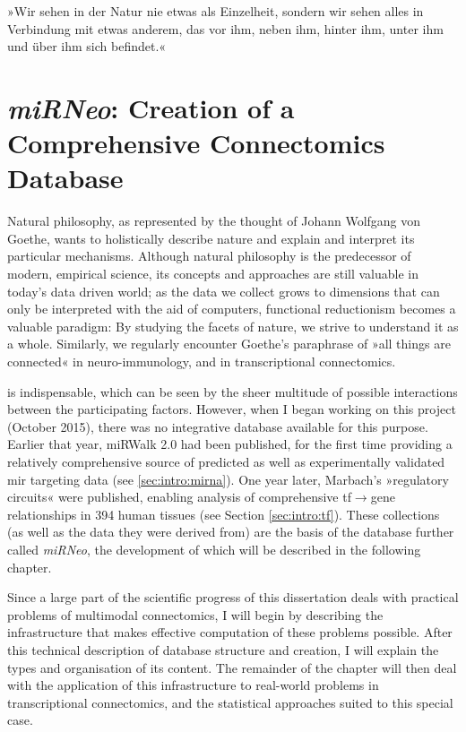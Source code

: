 \begin{savequote}[75mm]
»Wir sehen in der Natur nie etwas als Einzelheit, sondern wir sehen alles in Verbindung mit etwas anderem, das vor ihm, neben ihm, hinter ihm, unter ihm und über ihm sich befindet.«
\end{savequote}

\chapter[miRNeo: Creation of a Comprehensive Connectomics Database]{\textit{miRNeo}: Creation of a\\Comprehensive Connectomics Database} \label{sec:database:mirnet}
Natural philosophy, as represented by the thought of Johann Wolfgang von Goethe, wants to holistically describe nature and explain and interpret its particular mechanisms. Although natural philosophy is the predecessor of modern, empirical science, its concepts and approaches are still valuable in today's data driven world; as the data we collect grows to dimensions that can only be interpreted with the aid of computers, functional reductionism becomes a valuable paradigm: By studying the facets of nature, we strive to understand it as a whole. Similarly, we regularly encounter Goethe's paraphrase of »all things are connected« in neuro-immunology, and in transcriptional connectomics.

 is indispensable, which can be seen by the sheer multitude of possible interactions between the participating factors. However, when I began working on this project (October 2015), there was no integrative database available for this purpose. Earlier that year, miRWalk 2.0 had been published, for the first time providing a relatively comprehensive source of predicted as well as experimentally validated \ac{mir} targeting data\cite{Dweep2015} (see \ref{sec:intro:mirna}). One year later, Marbach's »regulatory circuits« were published,\cite{Marbach2016} enabling analysis of comprehensive \ac{tf}$\to$gene relationships in 394 human tissues (see Section \ref{sec:intro:tf}). These collections (as well as the data they were derived from) are the basis of the database further called \textit{miRNeo}, the development of which will be described in the following chapter.

Since a large part of the scientific progress of this dissertation deals with practical problems of multimodal connectomics, I will begin by describing the infrastructure that makes effective computation of these problems possible. After this technical description of database structure and creation, I will explain the types and organisation of its content. The remainder of the chapter will then deal with the application of this infrastructure to real-world problems in transcriptional connectomics, and the statistical approaches suited to this special case.

